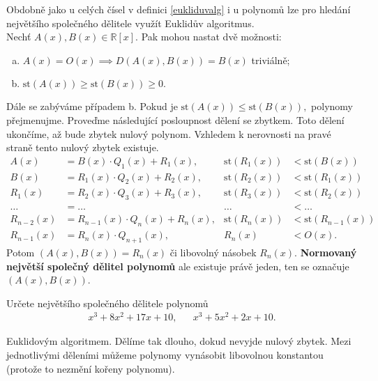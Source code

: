 \begin{pozn}
  Obdobně jako u celých čísel v definici \ref{eukliduvalg} i u polynomů lze pro hledání největšího společného dělitele využít Euklidův algoritmus.\\
  Nechť $A(x), B(x) \in \mathbb R [x]$. Pak mohou nastat dvě možnosti:
  \begin{enumerate}[a.]
    \item $A(x) = O(x) \implies D(A(x), B(x)) = B(x)$ triviálně;
    \item $\text{st}(A(x)) \geq \text{st}(B(x)) \geq 0.$
  \end{enumerate}
  Dále se zabýváme případem b. Pokud je $\text{st}(A(x)) \le \text{st}(B(x)),$ polynomy přejmenujme.
  Proveďme následující posloupnost dělení se zbytkem. Toto dělení ukončíme, až bude zbytek nulový polynom.
  Vzhledem k nerovnosti na pravé straně tento nulový zbytek existuje.
  \begin{align*}
    A(x) & = B(x) \cdot Q_1(x) + R_1(x),  & \text{st}(R_1(x)) & < \text{st}(B(x)) \\
    B(x) & = R_1(x) \cdot Q_2(x) + R_2(x), & \text{st}(R_2(x)) & < \text{st}(R_1(x)) \\
    R_1(x) & = R_2(x) \cdot Q_3(x) + R_3(x), & \text{st}(R_3(x)) & < \text{st}(R_2(x))\\
    \dots & = \dots & \dots & < \dots\\
    R_{n-2}(x) & = R_{n-1}(x) \cdot Q_n(x) + R_n(x), & \text{st}(R_n(x)) & < \text{st}(R_{n-1}(x)) \\
    R_{n-1}(x) & = R_{n}(x) \cdot Q_{n+1}(x), & R_{n}(x) & < O(x).
  \end{align*}
  Potom $(A(x), B(x)) = R_n(x)$ či libovolný násobek $R_n(x)$. \textbf{Normovaný největší společný dělitel polynomů}
  ale existuje právě jeden, ten se označuje $(A(x), B(x))$.
\end{pozn}

\begin{priklad}
    Určete největšího společného dělitele polynomů
    \begin{align*}
        x^3+8x^2+17x+10,& &   x^3+5x^2+2x+10.
    \end{align*}
\end{priklad}

\begin{reseni}
Euklidovým algoritmem. Dělíme tak dlouho, dokud nevyjde nulový zbytek.
Mezi jednotlivými děleními můžeme polynomy vynásobit libovolnou konstantou (protože
to nezmění kořeny polynomu).
\end{reseni}

